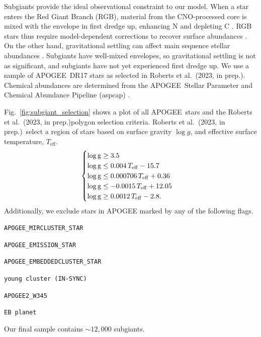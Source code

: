 \documentclass[fleqn,
usenatbib]{mnras}
\newcommand{\citetjack}{Roberts et al.~(2023, in prep.)}
\newcommand{\apogee}{APOGEE}
\newcommand{\about}[1]{${\sim} #1$}
\begin{document}
Subgiants provide the ideal observational constraint to our model. 
When a star enters the Red Giant Branch (RGB), material from the CNO-processed core is mixed with the envelope in first dredge up, enhancing N and depleting C \citep{iben67, vincenzo+21,KL14}. RGB stars thus require model-dependent corrections to recover surface abundances \citep[e.g.][]{vincenzo+21}. On the other hand, gravitational settling can affect main sequence stellar abundances \citep[e.g.][]{souto19}. Subgiants have well-mixed envelopes, so gravitational settling is not as significant, and subgiants have not yet experienced first dredge up. We use a sample of \apogee\ DR17 stars \citep{apogee17} as selected in \citetjack.  
Chemical abundances are determined from the \apogee\ Stellar Parameter and Chemical Abundance Pipeline ({\sc aspcap}) \citep{aspcap}.  





Fig.~\ref{fig:subgiant_selection} shows a plot of all \apogee\ stars and the \citetjack polygon selection criteria. 
 \citetjack~select a region of stars based on surface gravity $\log g$, and effective surface temperature, $T_\text{eff}$.
 \begin{equation}
    \begin{cases} \label{eq:subgiant_selection}
        \log \text{g} \geq 3.5 \\
        \log \text{g} \leq 0.004\,T_{\rm eff} - 15.7 \\
        \log \text{g} \leq 0.000706\,T_{\rm eff} + 0.36 \\
        \log \text{g} \leq -0.0015\,T_{\rm eff} + 12.05 \\
        \log \text{g} \geq 0.0012\,T_{\rm eff} - 2.8. \\
    \end{cases}
\end{equation}
Additionally, we exclude stars in \apogee{} marked by any of the following flags.
\begin{description}
\item \verb|APOGEE_MIRCLUSTER_STAR|
\item \verb|APOGEE_EMISSION_STAR|
\item \verb|APOGEE_EMBEDDEDCLUSTER_STAR|
\item \verb|young cluster (IN-SYNC)|
\item \verb|APOGEE2_W345|
\item \verb|EB planet|
\end{description}
Our final sample contains \about{12,000} subgiants.
\end{document}
